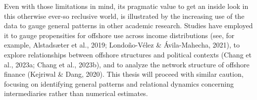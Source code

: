 Even with those limitations in mind, its pragmatic value to get an inside look in this otherwise ever-so reclusive world, is illustrated by the increasing use of the data to gauge general patterns in other academic research. Studies have employed it to gauge propensities for offshore use across income distributions (see, for example, Alstadsæter et al., 2019; Londoño-Vélez \& Ávila-Mahecha, 2021), to explore relationships between offshore structures and political contexts (Chang et al., 2023a; Chang et al., 2023b), and to analyze the network structure of offshore finance (Kejriwal \& Dang, 2020). This thesis will proceed with similar caution, focusing on identifying general patterns and relational dynamics concerning intermediaries rather than numerical estimates.




